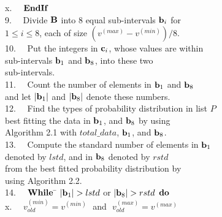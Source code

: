 \documentclass[lettersize,journal]{IEEEtran}
\begin{document}
\begin{tabbing}
x.~~ \>              \> ${\bf EndIf}$\\
9.~~ \>               \> Divide ${\bf B}$ into 8 equal sub-intervals ${\bf b}_{i}$ for \\
     \>               \> $1 \leq i \leq 8$, each of size $(v^{(max)} - v^{(min)})/8$. \\
10.~~\>               \> Put the integers in ${\bf c}_{i}$, whose values are within \\
     \>               \> sub-intervals ${\bf b}_{1}$ and ${\bf b}_{8}$, into these two \\
     \>               \> sub-intervals. \\
11.~~\>               \> Count the number of elements in ${\bf b}_{1}$ and ${\bf b}_{8}$  \\
     \>               \> and let $|{\bf b}_{1}|$ and $|{\bf b}_{8}|$ denote these numbers. \\
12.~~\>               \> Find the types of probability distribution in list $P$ \\
     \>               \> best fitting the data in ${\bf b}_{1}$, and ${\bf b}_{8}$ by using \\
     \>               \> Algorithm 2.1 with $total\_data$, ${\bf b}_{1}$, and ${\bf b}_{8}$. \\
13.~~\>               \> Compute the standard number of elements in ${\bf b}_{1}$ \\
     \>               \> denoted by $lstd$, and in ${\bf b}_{8}$ denoted by $rstd$ \\
     \>               \> from the best fitted probability distribution by \\
     \>               \> using Algorithm 2.2. \\
14.~~\>               \> ${\bf While}$ \= $|{\bf b}_{1}| > lstd$ or $|{\bf b}_{8}| > rstd$ ${\bf do}$ \\
x.~~\>               \>               \> $v^{(min)}_{old} = v^{(min)}$ \,\,and\,\, $v^{(max)}_{old} = v^{(max)}$ \\

\end{tabbing}
\end{document}
